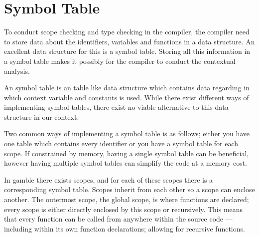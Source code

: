 \section{Symbol Table}
To conduct scope checking and type checking in the compiler, the compiler need to store data about the identifiers, variables and functions in a data structure.
An excellent data structure for this is a symbol table.
Storing all this information in a symbol table makes it possibly for the compiler to conduct the contextual analysis.

An symbol table is an table like data structure which contains data regarding in which context variable and constants is used.
While there exist different ways of implementing symbol tables, there exist no viable alternative to this data structure in our context.

Two common ways of implementing a symbol table is as follows; either you have one table which contains every identifier or you have a symbol table for each scope. 
If constrained by memory, having a single symbol table can be beneficial, however having multiple symbol tables can simplify the code at a memory cost. 

In \gls{gamble} there exists scopes, and for each of these scopes there is a corresponding symbol table. 
Scopes inherit from each other so a scope can enclose another. 
The outermost scope, the global scope, is where functions are declared; every scope is either directly enclosed by this scope or recursively.
This means that every function can be called from anywhere within the source code --- including within its own function declarations; allowing for recursive functions.

